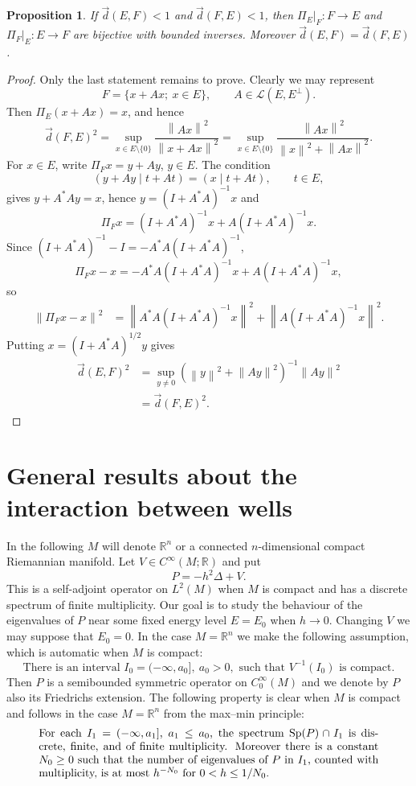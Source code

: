 \documentclass[11pt,a4paper]{article}
\newcommand{\R}{\mathbb R}
\newcommand{\Sp}{\operatorname{Sp}}
\newcommand{\norm}[1]{\left\lVert #1\right\rVert}
\newcommand{\ip}[2]{\left(#1\mid #2\right)}
\newcommand{\dvec}{\overset{\rightarrow}{d}}
\numberwithin{equation}{section}
\newtheorem{proposition}[theorem]{Proposition}
\theoremstyle{remark}
\begin{document}
\begin{proposition}
If $\dvec(E,F)<1$ and $\dvec(F,E)<1$, then $\Pi_E|_F:F\to E$ and $\Pi_F|_E:E\to F$ are bijective with bounded inverses. Moreover $\dvec(E,F)=\dvec(F,E)$.
\end{proposition}
\begin{proof}
Only the last statement remains to prove. Clearly we may represent
\[
F=\{x+Ax;\ x\in E\},\qquad A\in\mathcal L(E,E^\perp).
\]
Then $\Pi_E(x+Ax)=x$, and hence
\[
\dvec(F,E)^2=\sup_{x\in E\setminus\{0\}}\frac{\norm{Ax}^2}{\norm{x+Ax}^2}
=\sup_{x\in E\setminus\{0\}}\frac{\norm{Ax}^2}{\norm{x}^2+\norm{Ax}^2}.
\]
For $x\in E$, write $\Pi_Fx=y+Ay$, $y\in E$. The condition
\[
\ip{y+Ay}{t+At}=\ip{x}{t+At},\qquad t\in E,
\]
gives $y+A^*Ay=x$, hence $y=(I+A^*A)^{-1}x$ and
\[
\Pi_Fx=(I+A^*A)^{-1}x+A(I+A^*A)^{-1}x.
\]
Since $(I+A^*A)^{-1}-I=-A^*A(I+A^*A)^{-1}$,
\[
\Pi_Fx-x=-A^*A(I+A^*A)^{-1}x+A(I+A^*A)^{-1}x,
\]
so
\begin{align*}
\norm{\Pi_Fx-x}^2
&=\norm{A^*A(I+A^*A)^{-1}x}^2
 +\norm{A(I+A^*A)^{-1}x}^2.
\end{align*}
Putting $x=(I+A^*A)^{1/2}y$ gives
\begin{align*}
\dvec(E,F)^2
&=\sup_{y\ne0}(\norm y^2+\norm{Ay}^2)^{-1}\norm{Ay}^2\\
&=\dvec(F,E)^2.
\end{align*}
\end{proof}

\section{General results about the interaction between wells}
In the following $M$ will denote $\R^n$ or a connected $n$-dimensional compact Riemannian manifold. Let $V\in C^\infty(M;\R)$ and put
\[
P=-h^2\Delta+V.
\]
This is a self-adjoint operator on $L^2(M)$ when $M$ is compact and has a discrete spectrum of finite multiplicity. Our goal is to study the behaviour of the eigenvalues of $P$ near some fixed energy level $E=E_0$ when $h\to0$. Changing $V$ we may suppose that $E_0=0$. In the case $M=\R^n$ we make the following assumption, which is automatic when $M$ is compact:
\begin{equation}
\text{There is an interval }I_0=(-\infty,a_0],\ a_0>0,\text{ such that }V^{-1}(I_0)\text{ is compact.}
\end{equation}
Then $P$ is a semibounded symmetric operator on $C_0^\infty(M)$ and we denote by $P$ also its Friedrichs extension. The following property is clear when $M$ is compact and follows in the case $M=\R^n$ from the max--min principle:
\begin{equation}
\begin{minipage}{0.88\textwidth}
For each $I_1=(-\infty,a_1]$, $a_1\le a_0$, the spectrum $\Sp(P)\cap I_1$ is discrete, finite, and of finite multiplicity. Moreover there is a constant $N_0\ge0$ such that the number of eigenvalues of $P$ in $I_1$, counted with multiplicity, is at most $h^{-N_0}$ for $0<h\le1/N_0$.
\end{minipage}
\end{equation}
\end{document}
